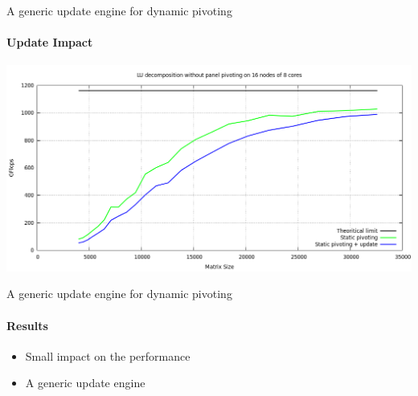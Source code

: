 \begin{frame}{A generic update engine for dynamic pivoting}
\framesubtitle{Update Impact}
\begin{center}
\includegraphics[width=1\textwidth]{dgetrf_update_problem.png} 
\end{center}
\end{frame}

\begin{frame}{A generic update engine for dynamic pivoting}
\framesubtitle{Results}
\begin{itemize}
\item Small impact on the performance
\item A generic update engine
\end{itemize}
\end{frame}